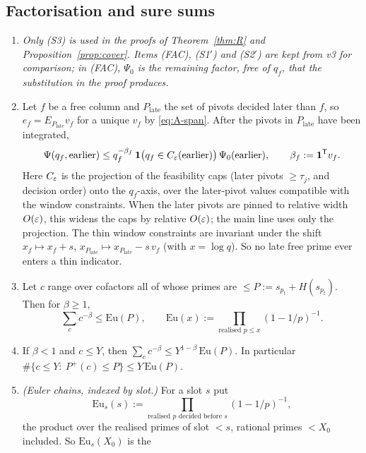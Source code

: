 \subsection{Factorisation and sure sums}\label{sec:A-fac}

\begin{lemma}\label{lem:fac}\label{lem:FAC}
\begin{enumerate}[label=(\arabic*),leftmargin=*]
\item[] \emph{Only (S3) is used in the proofs of Theorem~\ref{thm:R} and Proposition~\ref{prop:cover}. Items (FAC),
  (S1$'$) and (S2$'$) are kept from v3 for comparison; in (FAC), $\Psi_0$ is the remaining factor, free of $q_f$, that
  the substitution in the proof produces.}
\item[\textup{(FAC)}] Let $f$ be a free column and $P_{\mathrm{late}}$ the set of pivots decided later than $f$, so
  $e_f=E_{P_{\mathrm{late}}}v_f$ for a unique $v_f$ by \eqref{eq:A-span}. After the pivots in $P_{\mathrm{late}}$ have
  been integrated,
  \[
    \Psi(q_f,\text{earlier})\le q_f^{-\beta_f}\,\mathbf 1\bigl(q_f\in C_\varepsilon(\text{earlier})\bigr)\,\Psi_0(\text{earlier}),
    \qquad\beta_f:=\mathbf 1^{\mathsf T}v_f .
  \]
  Here $C_\varepsilon$ is the projection of the feasibility caps (later pivots $\ge\tau_j$, and decision order) onto the
  $q_f$-axis, over the later-pivot values compatible with the window constraints. When the later pivots are pinned to
  relative width $O(\varepsilon)$, this widens the caps by relative $O(\varepsilon)$; the main line uses only the projection. The thin
  window constraints are invariant under the shift $x_f\mapsto x_f+s$,
  $x_{P_{\mathrm{late}}}\mapsto x_{P_{\mathrm{late}}}-s\,v_f$ (with $x=\log q$). So no late free prime ever enters a
  thin indicator.
\item[\textup{(S1$'$)}] Let $c$ range over cofactors all of whose primes are $\le P:=s_{p_t}+H(s_{p_t})$. Then for $\beta\ge1$,
  \[
    \sum_c c^{-\beta}\le\mathrm{Eu}(P),\qquad \mathrm{Eu}(x):=\prod_{\text{realised }p\le x}(1-1/p)^{-1}.
  \]
\item[\textup{(S2$'$)}] If $\beta<1$ and $c\le Y$, then $\sum_cc^{-\beta}\le Y^{1-\beta}\,\mathrm{Eu}(P)$. In particular
  $\#\{c\le Y:\ P^+(c)\le P\}\le Y\,\mathrm{Eu}(P)$.
\item[\textup{(S3)}] \emph{(Euler chains, indexed by slot.)} For a slot $s$ put
  \[
    \mathrm{Eu}_s(s):=\prod_{\text{realised }p\text{ decided before }s}(1-1/p)^{-1},
  \]
  the product over the realised primes of slot $<s$, rational primes $<X_0$ included. So $\mathrm{Eu}_s(X_0)$ is the

\end{enumerate}
\end{lemma}
